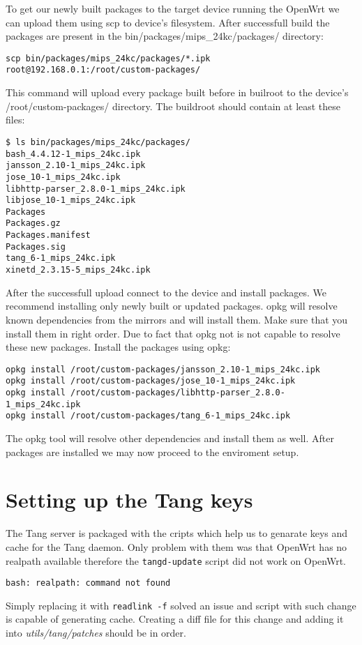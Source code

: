 To get our newly built packages to the target device running the OpenWrt we can upload them using scp to device's filesystem.
After successfull build the packages are present in the bin/packages/mips\_24kc/packages/ directory:
\begin{lstlisting}[columns=fixed,basicstyle=\ttfamily\footnotesize,tabsize=4,backgroundcolor=\color{yellow!10}]
scp bin/packages/mips_24kc/packages/*.ipk root@192.168.0.1:/root/custom-packages/
\end{lstlisting}
This command will upload every package built before in builroot to the device's /root/custom-packages/ directory.
The buildroot should contain at least these files:
\begin{lstlisting}[columns=fixed,basicstyle=\ttfamily\footnotesize,tabsize=4,backgroundcolor=\color{yellow!10}]
$ ls bin/packages/mips_24kc/packages/
bash_4.4.12-1_mips_24kc.ipk
jansson_2.10-1_mips_24kc.ipk
jose_10-1_mips_24kc.ipk
libhttp-parser_2.8.0-1_mips_24kc.ipk
libjose_10-1_mips_24kc.ipk
Packages
Packages.gz
Packages.manifest
Packages.sig
tang_6-1_mips_24kc.ipk
xinetd_2.3.15-5_mips_24kc.ipk
\end{lstlisting}
After the successfull upload connect to the device and install packages.
We recommend installing only newly built or updated packages.
opkg will resolve known dependencies from the mirrors and will install them.
Make sure that you install them in right order.
Due to fact that opkg not is not capable to resolve these new packages.
Install the packages using opkg:
\begin{lstlisting}[columns=fixed,basicstyle=\ttfamily\footnotesize,tabsize=4,backgroundcolor=\color{yellow!10}]
opkg install /root/custom-packages/jansson_2.10-1_mips_24kc.ipk
opkg install /root/custom-packages/jose_10-1_mips_24kc.ipk
opkg install /root/custom-packages/libhttp-parser_2.8.0-1_mips_24kc.ipk
opkg install /root/custom-packages/tang_6-1_mips_24kc.ipk
\end{lstlisting}
The opkg tool will resolve other dependencies and install them as well.
After packages are installed we may now proceed to the enviroment setup.



\section{Setting up the Tang keys}
The Tang server is packaged with the cripts which help us to genarate keys and cache for the Tang daemon.
Only problem with them was that OpenWrt has no realpath available therefore the {\tt tangd-update} script did not work on OpenWrt.
\begin{lstlisting}[columns=fixed,basicstyle=\ttfamily\footnotesize,tabsize=4,backgroundcolor=\color{yellow!10}]
bash: realpath: command not found
\end{lstlisting}
Simply replacing it with {\tt readlink -f} solved an issue and script with such change is capable of generating cache.
Creating a diff file for this change and adding it into {\it utils/tang/patches} should be in order.

